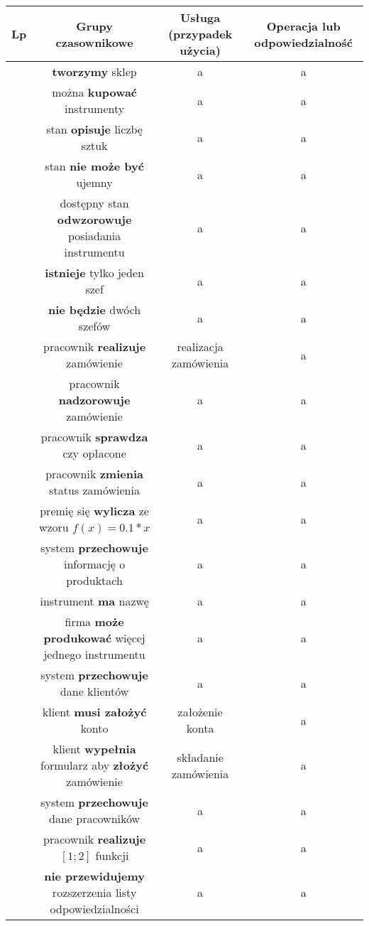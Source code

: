 \documentclass[a4page]{article}
\begin{document}
\begin{table}
\begin{adjustwidth}{-3cm}{}
\begin{tabular}{|c|c|c|c|}
				\hline
					Lp & Grupy czasownikowe & Usługa (przypadek użycia) & Operacja lub odpowiedzialność\\
				\hline
					\next & \textbf{tworzymy} sklep & a & a\\
				\hline
					\next & można \textbf{kupować} instrumenty & a & a\\
				\hline
					\next & stan \textbf{opisuje} liczbę sztuk & a & a\\
				\hline
					\next & stan \textbf{nie może być} ujemny & a & a\\
				\hline
					\next & dostępny stan \textbf{odwzorowuje} posiadania instrumentu & a & a\\
				\hline
					\next & \textbf{istnieje} tylko jeden szef & a & a\\
				\hline
					\next & \textbf{nie będzie} dwóch szefów & a & a\\
				\hline
					\next & pracownik \textbf{realizuje} zamówienie & realizacja zamówienia & a\\
				\hline
					\next & pracownik \textbf{nadzorowuje} zamówienie & a & a\\
				\hline
					\next & pracownik \textbf{sprawdza} czy opłacone & a & a\\
				\hline
					\next & pracownik \textbf{zmienia} status zamówienia & a & a\\
				\hline
					\next & premię się \textbf{wylicza} ze wzoru $f(x) = 0.1 * x$& a & a\\
				\hline
					\next & system \textbf{przechowuje} informację o produktach & a & a\\
				\hline
					\next & instrument \textbf{ma} nazwę & a & a\\
				\hline
					\next & firma \textbf{może produkować} więcej jednego instrumentu & a & a\\
				\hline
					\next & system \textbf{przechowuje} dane klientów & a & a\\
				\hline
					\next & klient \textbf{musi założyć} konto & założenie konta & a\\
				\hline
					\next & klient \textbf{wypełnia} formularz aby \textbf{złożyć} zamówienie & składanie zamówienia & a\\
				\hline
					\next & system \textbf{przechowuje} dane pracowników & a & a\\
				\hline
					\next & pracownik \textbf{realizuje} $[1; 2]$ funkcji & a & a\\
				\hline
					\next & \textbf{nie przewidujemy} rozszerzenia listy odpowiedzialności & a & a\\

\end{tabular}
\end{adjustwidth}
\end{table}
\end{document}
